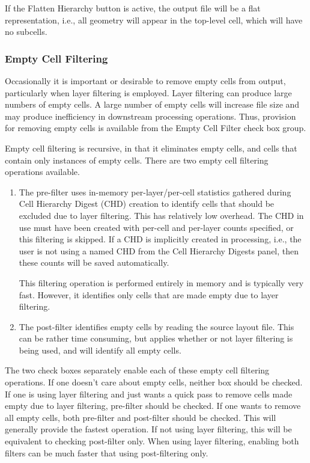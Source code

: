 If the {\cb Flatten Hierarchy} button is active, the output file will
be a flat representation, i.e., all geometry will appear in the
top-level cell, which will have no subcells.

\subsubsection{Empty Cell Filtering}
\label{ecfilt}

Occasionally it is important or desirable to remove empty cells from
output, particularly when layer filtering is employed.  Layer
filtering can produce large numbers of empty cells.  A large number of
empty cells will increase file size and may produce inefficiency in
downstream processing operations.  Thus, provision for removing empty
cells is available from the {\cb Empty Cell Filter} check box group.

Empty cell filtering is recursive, in that it eliminates empty cells,
and cells that contain only instances of empty cells.  There are two
empty cell filtering operations available.

\begin{enumerate}
\item{
The {\cb pre-filter} uses in-memory per-layer/per-cell
statistics gathered during Cell Hierarchy Digest (CHD) creation to
identify cells that should be excluded due to layer filtering.  This
has relatively low overhead.  The CHD in use must have been created
with {\cb per-cell and per-layer counts} specified, or this filtering
is skipped.  If a CHD is implicitly created in processing, i.e., the
user is not using a named CHD from the {\cb Cell Hierarchy Digests}
panel, then these counts will be saved automatically.

This filtering operation is performed entirely in memory and is
typically very fast.  However, it identifies only cells that are
made empty due to layer filtering. }

\item{
The {\cb post-filter} identifies empty cells by reading the source
layout file.  This can be rather time consuming, but applies whether
or not layer filtering is being used, and will identify all empty
cells. }
\end{enumerate}

The two check boxes separately enable each of these empty cell
filtering operations.  If one doesn't care about empty cells, neither
box should be checked.  If one is using layer filtering and just wants
a quick pass to remove cells made empty due to layer filtering, {\cb
pre-filter} should be checked.  If one wants to remove all empty
cells, both {\cb pre-filter} and {\cb post-filter} should be checked. 
This will generally provide the fastest operation.  If not using layer
filtering, this will be equivalent to checking {\cb post-filter} only. 
When using layer filtering, enabling both filters can be much faster
that using post-filtering only.


